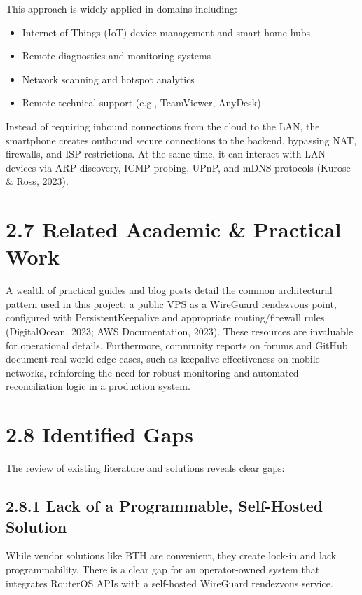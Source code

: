 \documentclass[12pt,a4paper,oneside]{report}
\begin{document}
This approach is widely applied in domains including:

\begin{itemize}
  \item Internet of Things (IoT) device management and smart-home hubs
  \item Remote diagnostics and monitoring systems
  \item Network scanning and hotspot analytics
  \item Remote technical support (e.g., TeamViewer, AnyDesk)
\end{itemize}

Instead of requiring inbound connections from the cloud to the LAN, the smartphone creates outbound secure connections to the backend, bypassing NAT, firewalls, and ISP restrictions. At the same time, it can interact with LAN devices via ARP discovery, ICMP probing, UPnP, and mDNS protocols (Kurose \& Ross, 2023).

\section{2.7 Related Academic \& Practical Work}

A wealth of practical guides and blog posts detail the common architectural pattern used in this project: a public VPS as a WireGuard rendezvous point, configured with PersistentKeepalive and appropriate routing/firewall rules (DigitalOcean, 2023; AWS Documentation, 2023). These resources are invaluable for operational details. Furthermore, community reports on forums and GitHub document real-world edge cases, such as keepalive effectiveness on mobile networks, reinforcing the need for robust monitoring and automated reconciliation logic in a production system.

\section{2.8 Identified Gaps}

The review of existing literature and solutions reveals clear gaps:

\subsection{2.8.1 Lack of a Programmable, Self-Hosted Solution}

While vendor solutions like BTH are convenient, they create lock-in and lack programmability. There is a clear gap for an operator-owned system that integrates RouterOS APIs with a self-hosted WireGuard rendezvous service.
\end{document}

